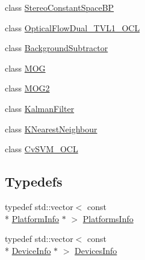 \begin{DoxyCompactItemize}
\item 
class \hyperlink{classcv_1_1ocl_1_1StereoConstantSpaceBP}{Stereo\-Constant\-Space\-B\-P}
\item 
class \hyperlink{classcv_1_1ocl_1_1OpticalFlowDual__TVL1__OCL}{Optical\-Flow\-Dual\-\_\-\-T\-V\-L1\-\_\-\-O\-C\-L}
\item 
class \hyperlink{classcv_1_1ocl_1_1BackgroundSubtractor}{Background\-Subtractor}
\item 
class \hyperlink{classcv_1_1ocl_1_1MOG}{M\-O\-G}
\item 
class \hyperlink{classcv_1_1ocl_1_1MOG2}{M\-O\-G2}
\item 
class \hyperlink{classcv_1_1ocl_1_1KalmanFilter}{Kalman\-Filter}
\item 
class \hyperlink{classcv_1_1ocl_1_1KNearestNeighbour}{K\-Nearest\-Neighbour}
\item 
class \hyperlink{classcv_1_1ocl_1_1CvSVM__OCL}{Cv\-S\-V\-M\-\_\-\-O\-C\-L}
\end{DoxyCompactItemize}
\subsection*{Typedefs}
\begin{DoxyCompactItemize}
\item 
typedef std\-::vector$<$ const \\*
\hyperlink{structcv_1_1ocl_1_1PlatformInfo}{Platform\-Info} $\ast$ $>$ \hyperlink{namespacecv_1_1ocl_a023858a053cfb1cbf0545e54dcc8c798}{Platforms\-Info}
\item 
typedef std\-::vector$<$ const \\*
\hyperlink{structcv_1_1ocl_1_1DeviceInfo}{Device\-Info} $\ast$ $>$ \hyperlink{namespacecv_1_1ocl_a0ce4074167f6aee3ebee6861ad51cffd}{Devices\-Info}
\end{DoxyCompactItemize}
